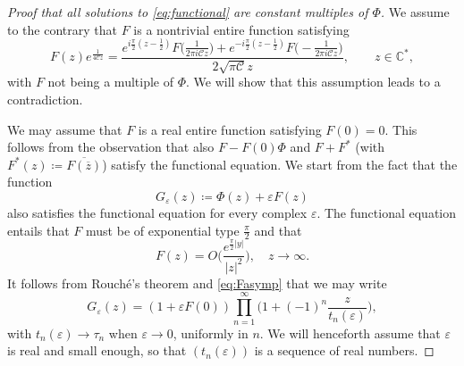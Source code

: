 \documentclass[12pt]{amsart}
\theoremstyle{plain}
\numberwithin{equation}{section}
\theoremstyle{definition}
\newcommand{\C}{\mathbb{C}}
\begin{document}
\begin{proof}[Proof that all solutions to \eqref{eq:functional} are  constant multiples of $\Phi$] We assume to the contrary that $F$ is a nontrivial entire function satisfying
\[ F(z) e^{\frac{1}{4\mathscr C z}}= \frac{e^{i\frac{\pi}{2}(z-\frac12)} F\big(\frac{1}{2\pi i \mathscr{C} z}\big)+e^{-i\frac{\pi}{2}(z-\frac12)} F\big(-\frac{1}{2\pi i \mathscr{C} z}\big)}{2\sqrt{\pi \mathscr{C}}z} ,\qquad z\in \C^\ast,\]
with $F$ not being a multiple of $\Phi$. We will show that this assumption leads to a contradiction.

We may assume that $F$ is a real entire function satisfying $F(0)=0$. This follows from the observation that also $F-F(0)\Phi$ and $F+F^\ast$ (with $F^\ast(z)\coloneqq \overline{F(\overline{z})}$) satisfy the functional equation. 
We start from the fact that the function
\[ G_{\varepsilon}(z)\coloneqq \Phi(z)+\varepsilon F(z)  \]
also satisfies the functional equation for every complex $\varepsilon$. The functional equation entails that $F$ must be of exponential type $\frac{\pi}{2}$ and that
\begin{equation} \label{eq:Fasymp} F(z)= O\Big(\frac{e^{\frac{\pi}{2}|y|}}{|z|^2} \Big), \quad z\to \infty . \end{equation} It follows from Rouch\'{e}'s theorem and \eqref{eq:Fasymp} that we may write
\[ G_{\varepsilon}(z)=(1+\varepsilon F(0)) \prod_{n=1}^\infty \Big(1+(-1)^n\frac{z}{t_n(\varepsilon)}\Big), \]
with $t_n(\varepsilon)\to \tau_n$ when $\varepsilon\to 0$, uniformly in $n$. We will henceforth assume that $\varepsilon$ is real and small enough, so that $(t_n(\varepsilon))$ is a sequence of real numbers. 


\end{proof}
\end{document}
